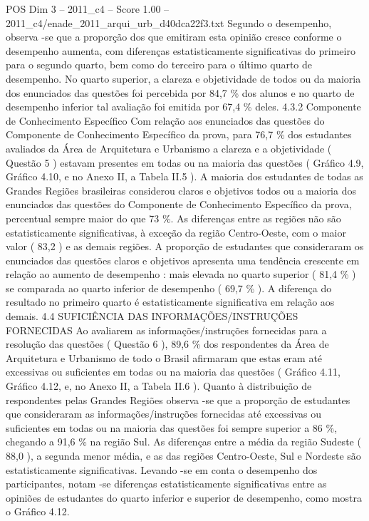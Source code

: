 \begin{textsample}{POS Dim 3 – 2011\_c4 – Score 1.00 – 2011\_c4/enade\_2011\_arqui\_urb\_d40dca22f3.txt}
Segundo o desempenho, observa -se que a proporção dos que emitiram esta opinião cresce conforme o desempenho aumenta, com diferenças estatisticamente significativas do primeiro para o segundo quarto, bem como do terceiro para o último quarto de desempenho.
No quarto superior, a clareza e objetividade de todos ou da maioria dos enunciados das questões foi percebida por 84,7 \% dos alunos e no quarto de desempenho inferior tal avaliação foi emitida por 67,4 \% deles. 4.3.2 Componente de Conhecimento Específico Com relação aos enunciados das questões do Componente de Conhecimento Específico da prova, para 76,7 \% dos estudantes avaliados da Área de Arquitetura e Urbanismo a clareza e a objetividade ( Questão 5 ) estavam presentes em todas ou na maioria das questões ( Gráfico 4.9, Gráfico 4.10, e no Anexo II, a Tabela II.5 ).
A maioria dos estudantes de todas as Grandes Regiões brasileiras considerou claros e objetivos todos ou a maioria dos enunciados das questões do Componente de Conhecimento Específico da prova, percentual sempre maior do que 73 \%.
As diferenças entre as regiões não são estatisticamente significativas, à exceção da região Centro-Oeste, com o maior valor ( 83,2 ) e as demais regiões.
A proporção de estudantes que consideraram os enunciados das questões claros e objetivos apresenta uma tendência crescente em relação ao aumento de desempenho : mais elevada no quarto superior ( 81,4 \% ) se comparada ao quarto inferior de desempenho ( 69,7 \% ).
A diferença do resultado no primeiro quarto é estatisticamente significativa em relação aos demais. 4.4 SUFICIÊNCIA DAS INFORMAÇÕES/INSTRUÇÕES FORNECIDAS Ao avaliarem as informações/instruções fornecidas para a resolução das questões ( Questão 6 ), 89,6 \% dos respondentes da Área de Arquitetura e Urbanismo de todo o Brasil afirmaram que estas eram até excessivas ou suficientes em todas ou na maioria das questões ( Gráfico 4.11, Gráfico 4.12, e, no Anexo II, a Tabela II.6 ).
Quanto à distribuição de respondentes pelas Grandes Regiões observa -se que a proporção de estudantes que consideraram as informações/instruções fornecidas até excessivas ou suficientes em todas ou na maioria das questões foi sempre superior a 86 \%, chegando a 91,6 \% na região Sul.
As diferenças entre a média da região Sudeste ( 88,0 ), a segunda menor média, e as das regiões Centro-Oeste, Sul e Nordeste são estatisticamente significativas.
Levando -se em conta o desempenho dos participantes, notam -se diferenças estatisticamente significativas entre as opiniões de estudantes do quarto inferior e superior de desempenho, como mostra o Gráfico 4.12.

\end{textsample}
